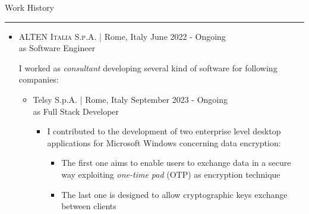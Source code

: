 \documentclass[english,10pt,a4paper]{article}
\newcommand{\SubCompanyName}[1]{\textcolor{CvIcon}{{\footnotesize \textsf{#1}}}}
\newcommand{\CompanyName}[1]{\textsc{{\small #1}}}
\newcommand{\JobTimeRange}[1]{{\scriptsize \textcolor{CvColor!50}{\faCalendar*} \hspace{0.01cm} \textcolor{CvIcon}{#1}}}
\newcommand{\CvSection}[2]{
	\hspace{0.25cm}\textcolor{CvColor!50}{#1} \hspace{0.01cm} \textcolor{CvColor!80}{#2}\\
	\textcolor{CvColor}{\rule[.7\baselineskip]{\textwidth}{1pt}}}
\begin{document}
\begin{paracol}{2}
\begin{tcolorbox}[colback=CvSidebarBackColor,height=\textheight,boxrule=0pt, left=0pt,right=0pt,top=0pt,bottom=0pt, arc=0pt,outer arc=0pt, colframe=CvSidebarBackColor]
	
		
	
	
		
\end{tcolorbox}
\switchcolumn
\begin{tcolorbox}[colback=white, height=\textheight, colframe=white, left=0cm]

		
		\vspace{0.3cm}	
		\CvSection{\faBriefcase}{Work History}
	
	\begin{itemize}		
		\item \CompanyName{ALTEN Italia S.p.A.} \textcolor{CvColor}{|} {\scriptsize Rome, Italy} \hfill \JobTimeRange{June 2022 - Ongoing} \\
		{\scriptsize \textcolor{CvIcon}{as} \textcolor{CvColor}{Software Engineer}} 
		\vspace{0.25cm}
		
			{
				\footnotesize I worked as \textit{consultant} developing several kind of software for following companies:
				\begin{itemize}
					
					\item \SubCompanyName{Telsy S.p.A.} \textcolor{CvColor}{|} {\scriptsize Rome, Italy} \hfill \JobTimeRange{September 2023 - Ongoing}\\	
					{\scriptsize \textcolor{CvIcon}{as} \textcolor{CvColor}{Full Stack Developer}}		
					
					\begin{itemize}
						\item I contributed to the development of two enterprise level desktop applications for Microsoft Windows concerning data encryption: 
						
						\begin{itemize}
							\item The first one aims to enable users to exchange data in a secure way exploiting \textit{one-time pad} (OTP) as encryption technique
							
							\item The last one is designed to allow cryptographic keys exchange between clients
						\end{itemize}
									

\end{itemize}
\end{itemize}}
\end{itemize}
\end{tcolorbox}
\end{paracol}
\end{document}
